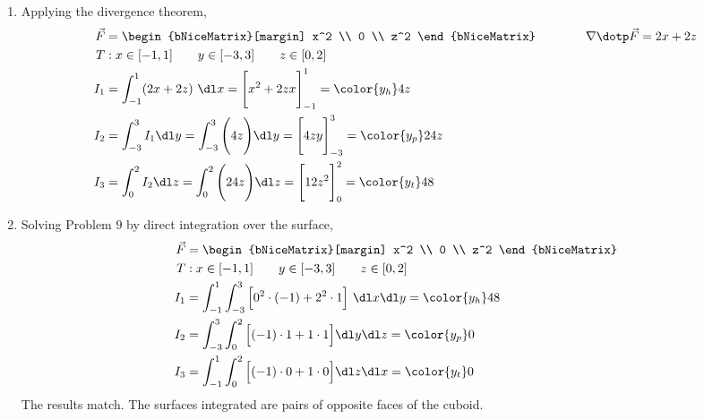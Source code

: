 \begin{enumerate}
    \item Applying the divergence theorem,
          \begin{align}
              \vec{F} & = \begin{bNiceMatrix}[margin]
                              x^2 \\ 0 \\ z^2
                          \end{bNiceMatrix} \qquad\qquad
              \nabla \dotp \vec{F} = 2x + 2z                                     \\
              T       & : x \in [-1, 1] \qquad y \in [-3, 3] \qquad z \in [0, 2] \\
              I_1     & = \int_{-1}^{1} (2x + 2z) \ \dl x
              = \Bigg[ x^2 + 2zx \Bigg]_{-1}^{1}
              = {\color{y_h} 4z}                                                 \\
              I_2     & = \int_{-3}^{3}I_1 \dl y
              = \int_{-3}^{3} \Bigg( 4z \Bigg) \dl y
              = \Bigg[ 4zy \Bigg]_{-3}^{3}
              = {\color{y_p} 24z }                                               \\
              I_3     & = \int_{0}^{2} I_2 \dl z = \int_{0}^{2}
              \Bigg( 24z \Bigg) \dl z
              = \Bigg[ 12z^2 \Bigg]_{0}^{2}
              = {\color{y_t} 48}
          \end{align}

    \item Solving Problem $ 9 $ by direct integration over the surface,
          \begin{align}
              \vec{F} & = \begin{bNiceMatrix}[margin]
                              x^2 \\ 0 \\ z^2
                          \end{bNiceMatrix}                             \\
              T       & : x \in [-1, 1] \qquad y \in [-3, 3] \qquad z \in [0, 2] \\
              I_1     & = \int_{-1}^{1} \int_{-3}^{3}
              \Big[ 0^2 \cdot (-1) + 2^2 \cdot 1 \Big] \ \dl x \dl y
              = {\color{y_h} 48}                                                 \\
              I_2     & = \int_{-3}^{3} \int_{0}^{2}
              \Big[ (-1) \cdot 1 + 1 \cdot 1 \Big] \dl y \dl z
              = {\color{y_p} 0}                                                  \\
              I_3     & = \int_{-1}^{1}\int_{0}^{2} \Big[
                  (-1) \cdot 0 + 1 \cdot 0 \Big]  \dl z \dl x
              = {\color{y_t} 0}
          \end{align}
          The results match. The surfaces integrated are pairs of opposite faces
          of the cuboid.


\end{enumerate}

